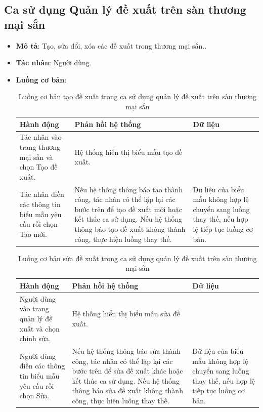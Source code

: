 \documentclass[./../main.tex]{subfiles}
\begin{document}
\subsection{Ca sử dụng Quản lý đề xuất trên sàn thương mại sắn}
\begin{itemize}
    \item \textbf{Mô tả}: Tạo, sửa đổi, xóa các đề xuất trong thương mại sắn..
    \item \textbf{Tác nhân}: Người dùng.
    \item \textbf{Luồng cơ bản}:
    \begin{table}[H]
    \caption{\label{uc-35}Luồng cơ bản tạo đề xuất trong ca sử dụng quản lý đề xuất trên sàn thương mại sắn}
    \begin{tabularx}{\textwidth}{| X | X | X |}
        \hline
        \textbf{Hành động} & \textbf{Phản hồi hệ thống} & \textbf{Dữ liệu} 
        \\ \hline
        Tác nhân vào trang thương mại sắn và chọn Tạo đề xuất. & Hệ thống hiển thị biểu mẫu tạo đề xuất. & 
        \\ \hline
        Tác nhân điền các thông tin biểu mẫu yêu cầu rồi chọn Tạo mới. & Nếu hệ thống thông báo tạo thành công, tác nhân có thể lặp lại các bước trên để tạo đề xuất mới hoặc kết thúc ca sử dụng. Nếu hệ thống thông báo tạo đề xuất không thành công, thực hiện luồng thay thế. & Dữ liệu của biểu mẫu không hợp lệ chuyển sang luồng thay thế, nếu hợp lệ tiếp tục luồng cơ bản.
        \\ \hline
    \end{tabularx}
    \end{table} 
    \begin{table}[H]
    \caption{\label{uc-36}Luồng cơ bản sửa đề xuất trong ca sử dụng quản lý đề xuất trên sàn thương mại sắn}
    \begin{tabularx}{\textwidth}{| X | X | X |}
        \hline
        \textbf{Hành động} & \textbf{Phản hồi hệ thống} & \textbf{Dữ liệu} 
        \\ \hline
        Người dùng vào trang quản lý đề xuất và chọn chỉnh sửa. & Hệ thống hiển thị biểu mẫu sửa đề xuất. & 
        \\ \hline
        Người dùng điền các thông tin biểu mẫu yêu cầu rồi chọn Sửa. & Nếu hệ thống thông báo sửa thành công, tác nhân có thể lặp lại các bước trên để sửa đề xuất khác hoặc kết thúc ca sử dụng. Nếu hệ thống thông báo sửa đề xuất không thành công, thực hiện luồng thay thế. & Dữ liệu của biểu mẫu không hợp lệ chuyển sang luồng thay thế, nếu hợp lệ tiếp tục luồng cơ bản.

\end{tabularx}
\end{table}
\end{itemize}
\end{document}
